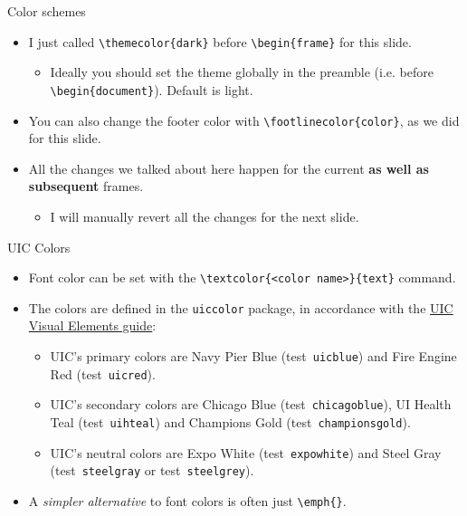 \documentclass{beamer}
\newcommand{\hrefcol}[2]{\textcolor{uihteal}{\href{#1}{#2}}}
\newcommand{\testcolor}[1]{\colorbox{#1}{\textcolor{#1}{test}}~\texttt{#1}}
\begin{document}
\begin{frame}[fragile]{Color schemes}
\begin{itemize}
\item I just called \verb|\themecolor{dark}| before \verb|\begin{frame}| for this slide.
\begin{itemize}
    \item Ideally you should set the theme globally in the preamble (i.e. before \verb|\begin{document}|). Default is light.
\end{itemize}
\item You can also change the footer color with \verb|\footlinecolor{color}|, as we did for this slide.
\item All the changes we talked about here happen for the current \textbf{as well as subsequent} frames.
\begin{itemize}
    \item I will manually revert all the changes for the next slide.
\end{itemize}
\end{itemize}
\end{frame}



\begin{frame}[fragile]{UIC Colors}
\begin{itemize}
\item Font color can be set with the \verb|\textcolor{<color name>}{text}| command.
\item The colors are defined in the \texttt{uiccolor} package, in accordance with the \hrefcol{https://marketing.uic.edu/marketing-toolbox/university-style-guide/visual-elements/}{UIC Visual Elements guide}:
\begin{itemize}
\item UIC's primary colors are Navy Pier Blue (\testcolor{uicblue}) and Fire Engine Red (\testcolor{uicred}).
\item UIC's secondary colors are Chicago Blue (\testcolor{chicagoblue}), UI Health Teal (\testcolor{uihteal}) and Champions Gold (\testcolor{championsgold}).
\item UIC's neutral colors are Expo White (\testcolor{expowhite}) and Steel Gray (\testcolor{steelgray} or \testcolor{steelgrey}).
\end{itemize}
\item A \emph{simpler alternative} to font colors is often just \verb|\emph{}|.
\end{itemize}
\end{frame}
\end{document}
